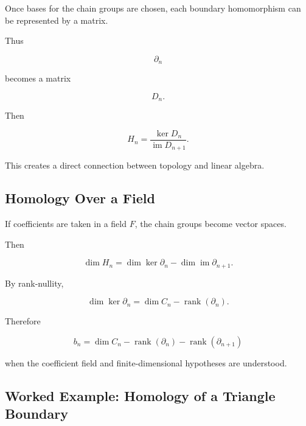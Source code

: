 Once bases for the chain groups are chosen, each boundary homomorphism can
be represented by a matrix.

Thus

\[
\partial_n
\]

becomes a matrix

\[
D_n.
\]

Then

\[
\boxed{
H_n
=
\frac{
\ker D_n
}{
\operatorname{im}D_{n+1}
}.
}
\]

This creates a direct connection between topology and linear algebra.

\subsection{Homology Over a Field}
\label{subsec:homology-over-field}

If coefficients are taken in a field \(F\), the chain groups become vector
spaces.

Then

\[
\boxed{
\dim H_n
=
\dim\ker\partial_n
-
\dim\operatorname{im}\partial_{n+1}.
}
\]

By rank-nullity,

\[
\dim\ker\partial_n
=
\dim C_n
-
\operatorname{rank}(\partial_n).
\]

Therefore

\[
\boxed{
b_n
=
\dim C_n
-
\operatorname{rank}(\partial_n)
-
\operatorname{rank}(\partial_{n+1})
}
\]

when the coefficient field and finite-dimensional hypotheses are understood.

\subsection{Worked Example: Homology of a Triangle Boundary}
\label{subsec:worked-homology-triangle-boundary}

